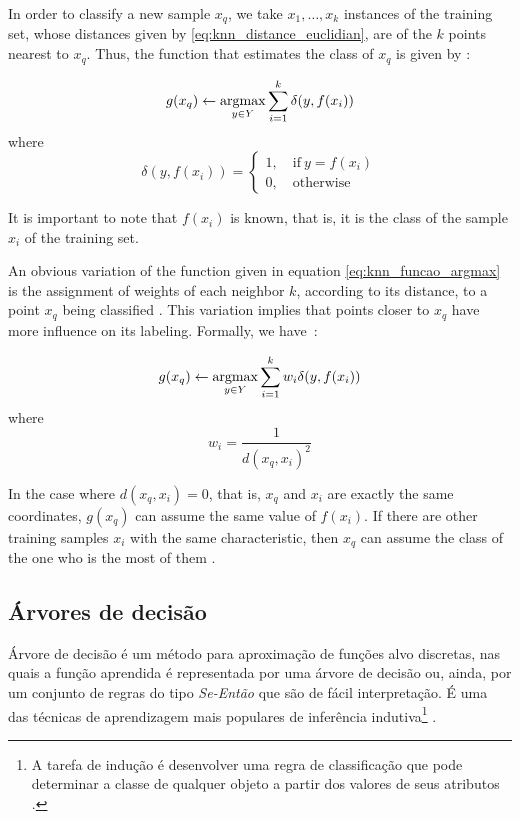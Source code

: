In order to classify a new sample $x_q$, we take $x_1, \ldots, x_k$ instances of the training set, whose distances given by \ref{eq:knn_distance_euclidian}, are of the $k$ points nearest to $x_q$. Thus, the function that estimates the class of $x_q$ is given by \citep{mitchell:97}:

\begin{equation}
\label{eq:knn_funcao_argmax}
g(x_q) \gets \operatorname*{argmax}_{y \in Y} \sum_{i=1}^k \delta (y, f(x_i))
\end{equation}
\noindent where
\begin{equation}
\label{eq:knn_delta}
  \delta (y, f(x_i)) =  \begin{cases}
                1, \quad \text{if}\ y = f(x_i) \\
                0, \quad \text{otherwise}
              \end{cases}
\end{equation}

It is important to note that $f(x_i)$ is known, that is, it is the class of the sample $x_i$ of the training set.

An obvious variation of the function given in equation \ref{eq:knn_funcao_argmax} is the assignment of weights of each neighbor $k$, according to its distance, to a point $x_q$ being classified \citep{mitchell:97}. This variation implies that points closer to $x_q$ have more influence on its labeling. Formally, we have~\citep{mitchell:97}:

\begin{equation}
\label{eq:knn_funcao_argmax_pesos}
g(x_q) \gets \operatorname*{argmax}_{y \in Y} \sum_{i=1}^k w_i \delta (y, f(x_i))
\end{equation}
\noindent where
\begin{equation}
\label{eq:knn_funcao_peso}
  w_i = \frac{1}{d(x_q, x_i)^2}
\end{equation}

In the case where $d(x_q, x_i) = 0$, that is, $x_q$ and $x_i$ are exactly the same coordinates, $g(x_q)$ can assume the same value of $f(x_i)$. If there are other training samples $x_i$ with the same characteristic, then $x_q$ can assume the class of the one who is the most of them \citep{mitchell:97}.



\subsection{Árvores de decisão}
\label{sec:classifiers_dt}
Árvore de decisão é um método para aproximação de funções alvo discretas, nas quais a função aprendida é representada por uma árvore de decisão ou, ainda, por um conjunto de regras do tipo \emph{Se-Então} que são de fácil interpretação. É uma das técnicas de aprendizagem mais populares de inferência indutiva\footnote{A tarefa de indução é desenvolver uma regra de classificação que pode determinar a classe de qualquer objeto a partir dos valores de seus atributos \citep{quinlan:86}.} \citep{mitchell:97}.

